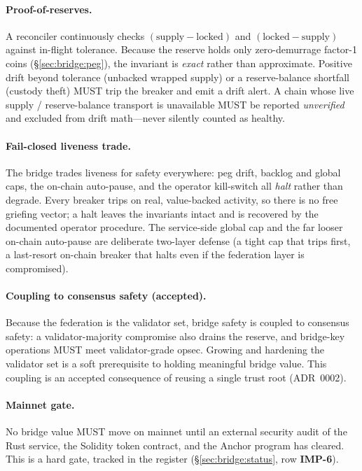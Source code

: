 \paragraph{Proof-of-reserves.} A reconciler continuously checks
$(\text{supply} - \text{locked})$ and $(\text{locked} - \text{supply})$ against
in-flight tolerance. Because the reserve holds only zero-demurrage factor-1
coins (\S\ref{sec:bridge:peg}), the invariant is \emph{exact} rather than
approximate. Positive drift beyond tolerance (unbacked wrapped supply) or a
reserve-balance shortfall (custody theft) MUST trip the breaker and emit a drift
alert. A chain whose live supply / reserve-balance transport is unavailable MUST
be reported \emph{unverified} and excluded from drift math---never silently
counted as healthy.

\paragraph{Fail-closed liveness trade.} The bridge trades liveness for safety
everywhere: peg drift, backlog and global caps, the on-chain auto-pause, and the
operator kill-switch all \emph{halt} rather than degrade. Every breaker trips on
real, value-backed activity, so there is no free griefing vector; a halt leaves
the invariants intact and is recovered by the documented operator procedure. The
service-side global cap and the far looser on-chain auto-pause are deliberate
two-layer defense (a tight cap that trips first, a last-resort on-chain breaker
that halts even if the federation layer is compromised).

\paragraph{Coupling to consensus safety (accepted).} Because the federation is
the validator set, bridge safety is coupled to consensus safety: a
validator-majority compromise also drains the reserve, and bridge-key operations
MUST meet validator-grade opsec. Growing and hardening the validator set is a
soft prerequisite to holding meaningful bridge value. This coupling is an
accepted consequence of reusing a single trust root (ADR~0002).

\paragraph{Mainnet gate.} No bridge value MUST move on mainnet until an external
security audit of the Rust service, the Solidity token contract, and the Anchor
program has cleared. This is a hard gate, tracked in the register
(\S\ref{sec:bridge:status}, row \textbf{IMP-6}).

